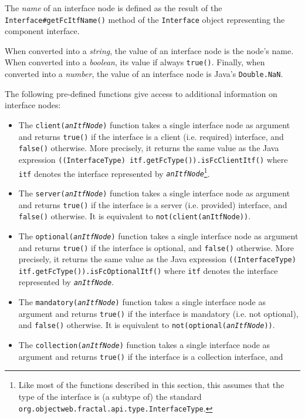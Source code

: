 \documentclass[a4paper,12pt]{report}
\begin{document}
The \emph{name} of an interface node is defined as the result of the
\texttt{Interface\#get\-Fc\-Itf\-Name()} method of the \texttt{Interface} object
representing the component interface.

When converted into a \emph{string}, the value of an interface node is the node's name.
When converted into a \emph{boolean}, its value if always \texttt{true()}. Finally, when
converted into a \emph{number}, the value of an interface node is Java's
\texttt{Double.NaN}.

The following pre-defined functions give access to additional information on interface
nodes:
\begin{itemize}
\item The \texttt{client(\textsl{anItfNode})} function takes a single interface node as
  argument and returns \texttt{true()} if the interface is a client (i.e. required)
  interface, and \texttt{false()} otherwise. More precisely, it returns the same value as
  the Java expression \texttt{((InterfaceType) itf.getFcType()).isFcClientItf()} where
  \texttt{itf} denotes the interface represented by
  \texttt{\textsl{anItfNode}}\footnote{Like most of the functions described in this
    section, this assumes that the type of the interface is (a subtype of) the standard
    \texttt{org.objectweb.fractal.api.type.InterfaceType}.}.
\item The \texttt{server(\textsl{anItfNode})} function takes a single interface node as
  argument and returns \texttt{true()} if the interface is a server (i.e. provided)
  interface, and \texttt{false()} otherwise. It is equivalent to
  \texttt{not(client(anItfNode))}.
\item The \texttt{optional(\textsl{anItfNode})} function takes a single interface node as
  argument and returns \texttt{true()} if the interface is optional, and \texttt{false()}
  otherwise. More precisely, it returns the same value as the Java expression
  \texttt{((InterfaceType) itf.getFcType()).isFcOptionalItf()} where \texttt{itf} denotes
  the interface represented by \texttt{\textsl{anItfNode}}.
\item The \texttt{mandatory(\textsl{anItfNode})} function takes a single interface node
  as argument and returns \texttt{true()} if the interface is mandatory (i.e. not
  optional), and \texttt{false()} otherwise. It is equivalent to
  \texttt{not(optional(\textsl{anItfNode}))}.
\item The \texttt{collection(\textsl{anItfNode})} function takes a single interface node
  as argument and returns \texttt{true()} if the interface is a collection interface, and

\end{itemize}
\end{document}
